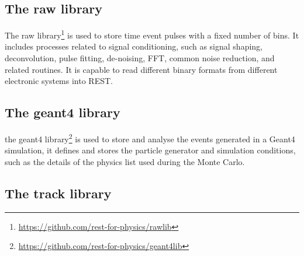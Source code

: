 \begin{figure}[hb!]
  \centering
	\caption{}\label{fig:readouts}
\end{figure}

\subsection{The raw library}

The raw library\footnote{\url{https://github.com/rest-for-physics/rawlib}} is used to store time event pulses with a fixed number of bins. It includes processes related to signal conditioning, such as signal shaping, deconvolution, pulse fitting, de-noising, FFT, common noise reduction, and related routines. It is capable to read different binary formats from different electronic systems into REST.

\subsection{The geant4 library}
the geant4 library\footnote{\url{https://github.com/rest-for-physics/geant4lib}} is used to store and analyse the events generated in a Geant4 simulation, it defines and stores the particle generator and simulation conditions, such as the details of the physics list used during the Monte Carlo.

\subsection{The track library}

